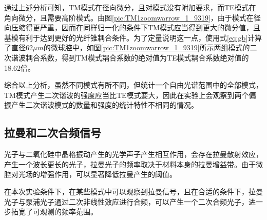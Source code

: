 \documentclass[UTF8,a4paper,cs4size,hyperref]{ctexart}
\begin{document}
通过上述分析可知，TM模式在径向微分，且对模式没有附加要求，而TE模式在角向微分，且需要高阶模式。由图\ref{pic:TM1zoomwarrow_1_9319}，由于模式在径向压缩得更严重，因而在同样归一化的条件下TM模式应当得到更大的微分值，且基模有利于达到更好的光纤锥耦合条件。为了定量说明这一点，使用式\ref{eq:gb}计算了直径62$\mu m$的微球腔中，如图\ref{pic:TM1zoomwarrow_1_9319}所示两组模式的二次谐波耦合系数，得到TM模式耦合系数的绝对值为TE模式耦合系数绝对值的18.62倍。

综合以上分析，虽然不同模式有所不同，但统计一个自由光谱范围中的全部模式，TM模式产生二次谐波的强度应当比TE模式要大，因此在实验上会观察到两个偏振产生二次谐波模式的数量和强度的统计特性不相同的情况。


\subsection{拉曼和二次合频信号}


光子与二氧化硅中晶格振动产生的光学声子产生相互作用，会存在拉曼散射效应\cite{boyd2003nonlinear}，产生一个波长更长的光子，拉曼光子的频率取决于材料本身的拉曼增益带。由于微腔对光场的增强作用，可以显著降低拉曼产生的阈值\cite{spillane2002ultralow, cai2000fiber, kippenberg2004ultralow}。 

在本次实验条件下，在某些模式中可以观察到拉曼信号，且在合适的条件下，拉曼光子与泵浦光子通过二次非线性效应进行合频，可以产生一个二次合频光子，进一步拓宽了可观测的频率范围。
\end{document}
